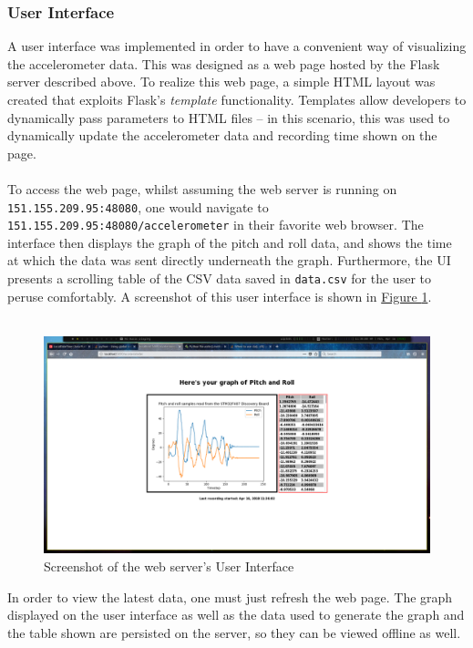 \subsubsection{User Interface}
A user interface was implemented in order to have a convenient way of visualizing the accelerometer
data. This was designed as a web page hosted by the Flask server described above. To realize this
web page, a simple HTML layout was created that exploits Flask's \textit{template} functionality.
Templates allow developers to dynamically pass parameters to HTML files -- in this scenario, this
was used to dynamically update the accelerometer data and recording time shown on the page.\\\\
To access the web page, whilst assuming the web server is running on \texttt{151.155.209.95:48080},
one would navigate to \texttt{151.155.209.95:48080/accelerometer} in their favorite web browser. The
interface then displays the graph of the pitch and roll data, and shows the time at which the data
was sent directly underneath the graph. Furthermore, the UI presents a scrolling table of the CSV
data saved in \texttt{data.csv} for the user to peruse comfortably. A screenshot of this user
interface is shown in \hyperref[fig:uiscreenshot]{Figure \ref{fig:uiscreenshot}}.\\\\
\begin{figure}[h]
	\caption{Screenshot of the web server's User Interface}\label{fig:uiscreenshot}
	\begin{center}
		\includegraphics[width=\textwidth]{uiscreenshot}
	\end{center}
\end{figure}
In order to view the latest data, one must just refresh the web page. The graph displayed on the
user interface as well as the data used to generate the graph and the table shown are persisted on
the server, so they can be viewed offline as well.
